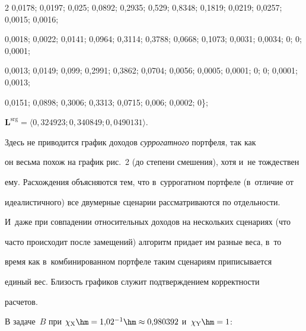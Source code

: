 \begin{multicols}{2}
0,0178; 0,0197; 0,025; 0,0892; 0,2935; 0,529; 0,8348; 0,1819; 0,0219; 0,0257; 0,0015; 0,0016; 


0,0018; 0,0022; 0,0141; 0,0964; 0,3114; 0,3788; 0,0668; 0,1073; 0,0031; 0,0034; 0; 0; 0,0001; 


0,0013; 0,0149; 0,099; 0,2991; 0,3862; 0,0704; 0,0056; 0,0005; 0,0001; 0; 0; 0,0001; 0,0013; 


0,0151; 0,0898; 0,3006; 0,3313; 0,0715; 0,006; 0,0002; 0\};





\vspace*{3pt}


  


  \noindent


  $\boldsymbol{L}^{\mathrm{srg}} = \langle 0{,}324923; 0{,}340849; 0{,}0490131\rangle$. 


  


  \vspace*{3pt}


  


  Здесь не приводится график доходов \textit{суррогатного} портфеля, так как 


он весьма похож на график рис.~2 (до степени смешения), хотя и~не тождествен 


ему. Расхождения объясняются тем, что в~суррогатном портфеле (в~отличие от 


идеалистичного) все двумерные сценарии рассматриваются по отдельности. 


И~даже при совпадении относительных доходов на нескольких сценариях (что 


часто происходит после замещений) алгоритм придает им разные веса, в~то 


время как в~комбинированном портфеле таким сценариям приписывается 


единый вес. Близость графиков служит подтверждением корректности 


расчетов. 


  


  В задаче~$B$ при $\chi_{\mathrm{X}}\hm= 1{,}02^{-1}


  \hm\approx 0{,}980392$ и~$\chi_{\mathrm{Y}}\hm = 1$:


  


  \vspace*{3pt}



\end{multicols}
